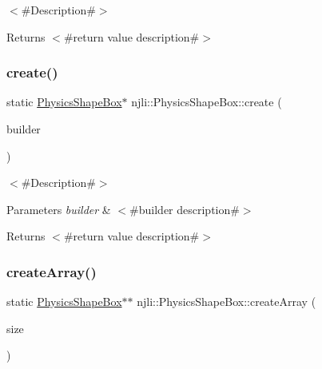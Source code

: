$<$\#\+Description\#$>$

\begin{DoxyReturn}{Returns}
$<$\#return value description\#$>$ 
\end{DoxyReturn}
\mbox{\label{classnjli_1_1_physics_shape_box_ab191df13c23f00ae7119b265444d3792}} 
\subsubsection{\texorpdfstring{create()}{create()}\hspace{0.1cm}{\footnotesize\ttfamily [2/2]}}
{\footnotesize\ttfamily static \mbox{\hyperlink{classnjli_1_1_physics_shape_box}{Physics\+Shape\+Box}}$\ast$ njli\+::\+Physics\+Shape\+Box\+::create (\begin{DoxyParamCaption}\item[{const \mbox{\hyperlink{classnjli_1_1_physics_shape_box_builder}{Physics\+Shape\+Box\+Builder}} \&}]{builder }\end{DoxyParamCaption})\hspace{0.3cm}{\ttfamily [static]}}

$<$\#\+Description\#$>$


\begin{DoxyParams}{Parameters}
{\em builder} & $<$\#builder description\#$>$\\
\hline
\end{DoxyParams}
\begin{DoxyReturn}{Returns}
$<$\#return value description\#$>$ 
\end{DoxyReturn}
\mbox{\label{classnjli_1_1_physics_shape_box_a0b8e1c864d1fc1be5e6b4b003666498b}} 
\subsubsection{\texorpdfstring{create\+Array()}{createArray()}}
{\footnotesize\ttfamily static \mbox{\hyperlink{classnjli_1_1_physics_shape_box}{Physics\+Shape\+Box}}$\ast$$\ast$ njli\+::\+Physics\+Shape\+Box\+::create\+Array (\begin{DoxyParamCaption}\item[{const \mbox{\hyperlink{_util_8h_a10e94b422ef0c20dcdec20d31a1f5049}{u32}}}]{size }\end{DoxyParamCaption})\hspace{0.3cm}{\ttfamily [static]}}

